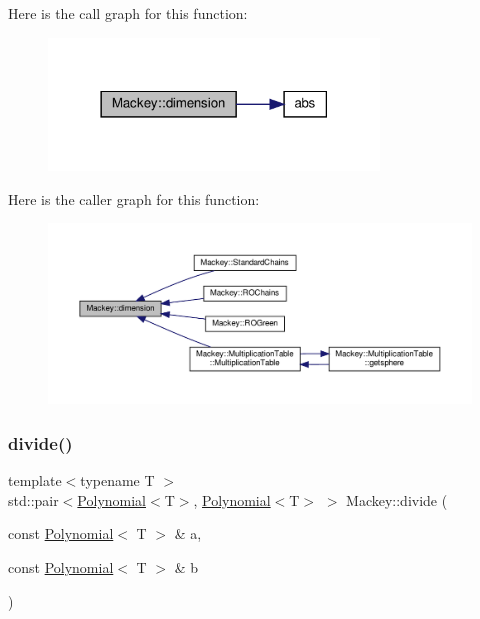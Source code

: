 Here is the call graph for this function\+:\nopagebreak
\begin{figure}[H]
\begin{center}
\leavevmode
\includegraphics[width=249pt]{namespaceMackey_a6a5d40e69e5628ea84896ee43f4a91fa_cgraph}
\end{center}
\end{figure}
Here is the caller graph for this function\+:\nopagebreak
\begin{figure}[H]
\begin{center}
\leavevmode
\includegraphics[width=350pt]{namespaceMackey_a6a5d40e69e5628ea84896ee43f4a91fa_icgraph}
\end{center}
\end{figure}
\mbox{\label{namespaceMackey_a04fadcf186ab504cafeb259178ee4827}} 
\subsubsection{\texorpdfstring{divide()}{divide()}}
{\footnotesize\ttfamily template$<$typename T $>$ \\
std\+::pair$<$\hyperlink{classMackey_1_1Polynomial}{Polynomial}$<$T$>$, \hyperlink{classMackey_1_1Polynomial}{Polynomial}$<$T$>$ $>$ Mackey\+::divide (\begin{DoxyParamCaption}\item[{const \hyperlink{classMackey_1_1Polynomial}{Polynomial}$<$ T $>$ \&}]{a,  }\item[{const \hyperlink{classMackey_1_1Polynomial}{Polynomial}$<$ T $>$ \&}]{b }\end{DoxyParamCaption})}

